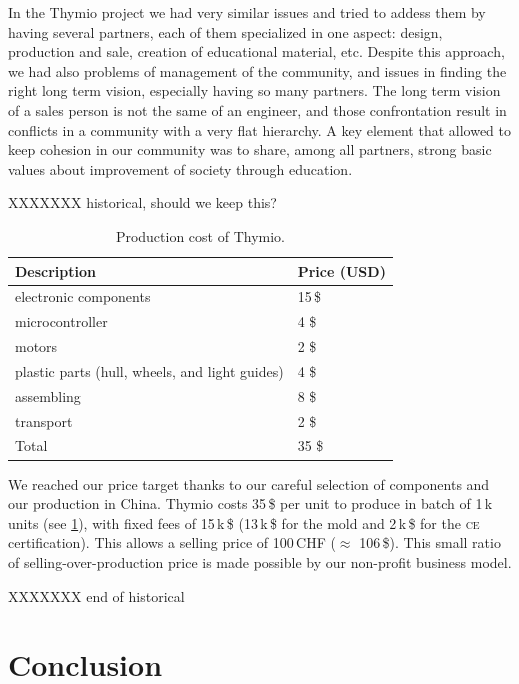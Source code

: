 \documentclass[letterpaper, 10 pt, conference]{ieeeconf}  %
\begin{document}
In the Thymio project we had very similar issues and tried to addess them by having several partners, each of them specialized in one aspect: design, production and sale, creation of educational material, etc.
Despite this approach, we had also problems of management of the community, and issues in finding the right long term vision, especially having so many partners. 
The long term vision of a sales person is not the same of an engineer, and those confrontation result in conflicts in a community with a very flat hierarchy. 
A key element that allowed to keep cohesion in our community was to share, among all partners, strong basic values about improvement of society through education.

XXXXXXX historical, should we keep this?

\begin{table}
\centering
\begin{tabularx}{\columnwidth}{ll}
\toprule
Description & Price (USD)\\
\midrule
electronic components & 15\,\$ \\
microcontroller & 4 \$ \\
motors & 2 \$ \\
plastic parts (hull, wheels, and light guides) & 4 \$ \\
assembling & 8 \$ \\
transport & 2 \$ \\
\bottomrule
Total & 35 \$ \\
\end{tabularx}
\caption{Production cost of Thymio.}
\label{tbl:thymio-price}
\end{table}

We reached our price target thanks to our careful selection of components and our production in China.
Thymio costs 35\,\$ per unit to produce in batch of 1\,k units (see \ref{tbl:thymio-price}), with fixed fees of 15\,k\,\$ (13\,k\,\$ for the mold and 2\,k\,\$ for the \textsc{ce} certification).
This allows a selling price of 100\,CHF ($\approx$ 106\,\$).
This small ratio of selling-over-production price is made possible by our non-profit business model.

XXXXXXX end of historical



\section{Conclusion}
\end{document}
